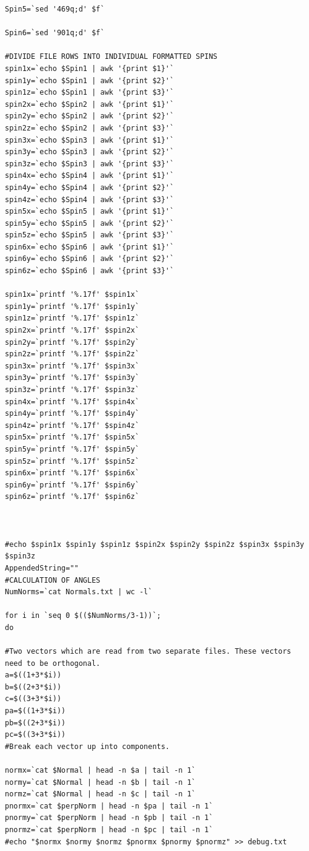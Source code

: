 \documentclass{article}
\begin{document}
\begin{lstlisting}
Spin5=`sed '469q;d' $f`

Spin6=`sed '901q;d' $f`

#DIVIDE FILE ROWS INTO INDIVIDUAL FORMATTED SPINS
spin1x=`echo $Spin1 | awk '{print $1}'`
spin1y=`echo $Spin1 | awk '{print $2}'`
spin1z=`echo $Spin1 | awk '{print $3}'`
spin2x=`echo $Spin2 | awk '{print $1}'`
spin2y=`echo $Spin2 | awk '{print $2}'`
spin2z=`echo $Spin2 | awk '{print $3}'`
spin3x=`echo $Spin3 | awk '{print $1}'`
spin3y=`echo $Spin3 | awk '{print $2}'`
spin3z=`echo $Spin3 | awk '{print $3}'`
spin4x=`echo $Spin4 | awk '{print $1}'`
spin4y=`echo $Spin4 | awk '{print $2}'`
spin4z=`echo $Spin4 | awk '{print $3}'`
spin5x=`echo $Spin5 | awk '{print $1}'`
spin5y=`echo $Spin5 | awk '{print $2}'`
spin5z=`echo $Spin5 | awk '{print $3}'`
spin6x=`echo $Spin6 | awk '{print $1}'`
spin6y=`echo $Spin6 | awk '{print $2}'`
spin6z=`echo $Spin6 | awk '{print $3}'`

spin1x=`printf '%.17f' $spin1x`
spin1y=`printf '%.17f' $spin1y`
spin1z=`printf '%.17f' $spin1z`
spin2x=`printf '%.17f' $spin2x`
spin2y=`printf '%.17f' $spin2y`
spin2z=`printf '%.17f' $spin2z`
spin3x=`printf '%.17f' $spin3x`
spin3y=`printf '%.17f' $spin3y`
spin3z=`printf '%.17f' $spin3z`
spin4x=`printf '%.17f' $spin4x`
spin4y=`printf '%.17f' $spin4y`
spin4z=`printf '%.17f' $spin4z`
spin5x=`printf '%.17f' $spin5x`
spin5y=`printf '%.17f' $spin5y`
spin5z=`printf '%.17f' $spin5z`
spin6x=`printf '%.17f' $spin6x`
spin6y=`printf '%.17f' $spin6y`
spin6z=`printf '%.17f' $spin6z`



#echo $spin1x $spin1y $spin1z $spin2x $spin2y $spin2z $spin3x $spin3y $spin3z
AppendedString=""
#CALCULATION OF ANGLES
NumNorms=`cat Normals.txt | wc -l`

for i in `seq 0 $(($NumNorms/3-1))`; 
do

#Two vectors which are read from two separate files. These vectors need to be orthogonal. 
a=$((1+3*$i))
b=$((2+3*$i))
c=$((3+3*$i))
pa=$((1+3*$i))
pb=$((2+3*$i))
pc=$((3+3*$i))
#Break each vector up into components. 

normx=`cat $Normal | head -n $a | tail -n 1`
normy=`cat $Normal | head -n $b | tail -n 1`
normz=`cat $Normal | head -n $c | tail -n 1`
pnormx=`cat $perpNorm | head -n $pa | tail -n 1`
pnormy=`cat $perpNorm | head -n $pb | tail -n 1`
pnormz=`cat $perpNorm | head -n $pc | tail -n 1`
#echo "$normx $normy $normz $pnormx $pnormy $pnormz" >> debug.txt



\end{lstlisting}
\end{document}
